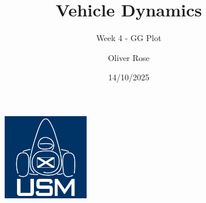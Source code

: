 \documentclass{beamer}
\title{Vehicle Dynamics}
\subtitle{Week 4 - GG Plot}
\author{Oliver Rose}
\institute{University of Strathclyde Motorsport}
\date{14/10/2025}
\begin{document}
\begin{frame}
    \maketitle
\end{frame}






\begin{frame}[focus]
    \begin{figure}
        \includegraphics[width=0.33\textwidth]{../../res/usm-logo.png}
    \end{figure}
\end{frame}
\end{document}
